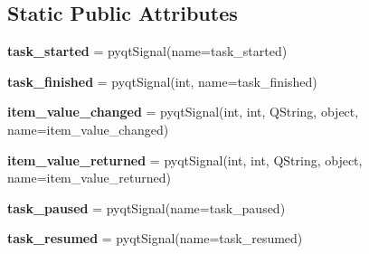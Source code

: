 \subsection*{Static Public Attributes}
\begin{DoxyCompactItemize}
\item 
{\bfseries task\+\_\+started} = pyqt\+Signal(name=\textquotesingle{}task\+\_\+started\textquotesingle{})\hypertarget{classplume-creator_1_1src_1_1plume_1_1data_1_1task_1_1_task_a86215ec5cae9089a681772b6b3f8b449}{}\label{classplume-creator_1_1src_1_1plume_1_1data_1_1task_1_1_task_a86215ec5cae9089a681772b6b3f8b449}

\item 
{\bfseries task\+\_\+finished} = pyqt\+Signal(int, name=\textquotesingle{}task\+\_\+finished\textquotesingle{})\hypertarget{classplume-creator_1_1src_1_1plume_1_1data_1_1task_1_1_task_af44dc57241379085af0fabbdda0d95eb}{}\label{classplume-creator_1_1src_1_1plume_1_1data_1_1task_1_1_task_af44dc57241379085af0fabbdda0d95eb}

\item 
{\bfseries item\+\_\+value\+\_\+changed} = pyqt\+Signal(int, int, \textquotesingle{}Q\+String\textquotesingle{}, object, name=\textquotesingle{}item\+\_\+value\+\_\+changed\textquotesingle{})\hypertarget{classplume-creator_1_1src_1_1plume_1_1data_1_1task_1_1_task_a94639c92e9bac6ef25e8fb5aead96eb1}{}\label{classplume-creator_1_1src_1_1plume_1_1data_1_1task_1_1_task_a94639c92e9bac6ef25e8fb5aead96eb1}

\item 
{\bfseries item\+\_\+value\+\_\+returned} = pyqt\+Signal(int, int, \textquotesingle{}Q\+String\textquotesingle{}, object, name=\textquotesingle{}item\+\_\+value\+\_\+returned\textquotesingle{})\hypertarget{classplume-creator_1_1src_1_1plume_1_1data_1_1task_1_1_task_aac4ebc2c16580706ddb2fe85252596a1}{}\label{classplume-creator_1_1src_1_1plume_1_1data_1_1task_1_1_task_aac4ebc2c16580706ddb2fe85252596a1}

\item 
{\bfseries task\+\_\+paused} = pyqt\+Signal(name=\textquotesingle{}task\+\_\+paused\textquotesingle{})\hypertarget{classplume-creator_1_1src_1_1plume_1_1data_1_1task_1_1_task_a3b28b6eb06528dbf29e2c1462ce2776c}{}\label{classplume-creator_1_1src_1_1plume_1_1data_1_1task_1_1_task_a3b28b6eb06528dbf29e2c1462ce2776c}

\item 
{\bfseries task\+\_\+resumed} = pyqt\+Signal(name=\textquotesingle{}task\+\_\+resumed\textquotesingle{})\hypertarget{classplume-creator_1_1src_1_1plume_1_1data_1_1task_1_1_task_a9694fa41b5b229ab4afad3a457ce5eab}{}\label{classplume-creator_1_1src_1_1plume_1_1data_1_1task_1_1_task_a9694fa41b5b229ab4afad3a457ce5eab}


\end{DoxyCompactItemize}
